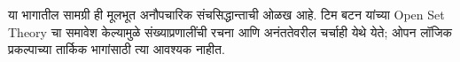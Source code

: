 \documentclass[../../include/open-logic-part]{subfiles}
\begin{document}

\begin{editorial}
  या भागातील सामग्री ही मूलभूत अनौपचारिक संचसिद्धान्ताची ओळख
  आहे. टिम बटन यांच्या Open Set Theory चा समावेश केल्यामुळे
  संख्याप्रणालींची रचना आणि अनंततेवरील चर्चाही येथे येते;
  ओपन लॉजिक प्रकल्पाच्या तार्किक भागांसाठी त्या आवश्यक नाहीत.
\end{editorial}







\OLEndPartHook
\end{document}
